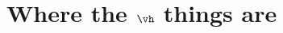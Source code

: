 \documentclass[10pt]{scrartcl}
\begin{document}
\section{Where the $\vh$ things are}
\makeatletter
\setlength{\fboxsep}{0pt}
\end{document}
